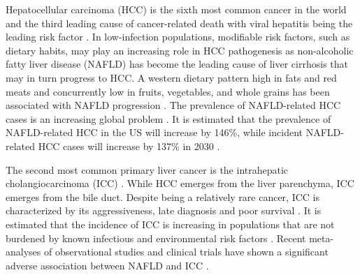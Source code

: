 \documentclass[
]{article}
\begin{document}
Hepatocellular carcinoma (HCC) is the sixth most common cancer in the
world and the third leading cause of cancer-related death with viral
hepatitis being the leading risk factor \autocite{Massarweh2017}. In
low-infection populations, modifiable risk factors, such as dietary
habits, may play an increasing role in HCC pathogenesis as non-alcoholic
fatty liver disease (NAFLD) has become the leading cause of liver
cirrhosis \autocite{Younossi2016,Younossi2020} that may in turn progress to
HCC. A western dietary pattern high in fats and red meats and
concurrently low in fruits, vegetables, and whole grains has been
associated with NAFLD progression \autocite{Guo2022}. The prevalence of
NAFLD-related HCC cases is an increasing global problem \autocite{Younossi2016}.
It is estimated that the prevalence of NAFLD-related HCC in the US will
increase by 146\%, while incident NAFLD-related HCC cases will increase
by 137\% in 2030 \autocite{Estes2018}.

The second most common primary liver cancer is the intrahepatic
cholangiocarcinoma (ICC) \autocite{Khan2019}. While HCC emerges from the liver
parenchyma, ICC emerges from the bile duct. Despite being a relatively
rare cancer, ICC is characterized by its aggressiveness, late diagnosis
and poor survival \autocite{kirstein2016}. It is estimated that the incidence of
ICC is increasing in populations that are not burdened by known
infectious and environmental risk factors \autocite{Bergquist2015}. Recent
meta-analyses of observational studies and clinical trials have shown a
significant adverse association between NAFLD and ICC
\autocite{Wongjarupong2017,corrao2020}.
\end{document}
